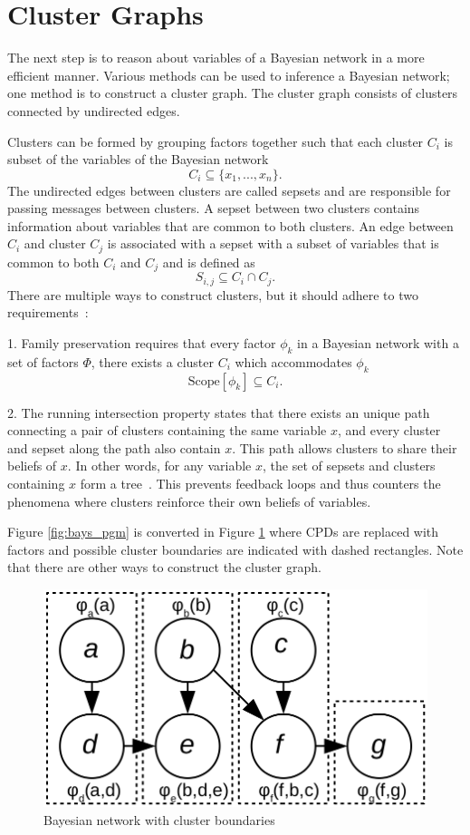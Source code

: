 \documentclass[12pt,oneside,openany,a4paper, %
afrikaans,english,
]{memoir}
\numberwithin{equation}{chapter}
\begin{document}
\section{Cluster Graphs}
The next step is to reason about variables of a Bayesian network in a more efficient manner. Various methods can be used to inference a Bayesian network; one method is to construct a cluster graph. The cluster graph consists of clusters connected by undirected edges.

Clusters can be formed by grouping factors together such that each cluster $C_i$ is subset of the variables of the Bayesian network
\begin{equation}
C_i \subseteq \{x_1, ..., x_n\}.
\end{equation}
The undirected edges between clusters are called sepsets and are responsible for passing messages between clusters. A sepset between two clusters contains information about variables that are common to both clusters. An edge between $C_i$ and cluster $C_j$ is associated with a sepset with a subset of variables that is common to both $C_i$ and $C_j$ and is defined as
\begin{equation}
S_{i,j} \subseteq C_i \cap C_j.
\end{equation}
There are multiple ways to construct clusters, but it should adhere to two requirements~\citep{koller}:

1. Family preservation requires that every factor $\phi_k$ in a Bayesian network with a set of factors $\Phi$, there exists a cluster $C_i$ which accommodates $\phi_k$
\begin{equation}
\text{Scope}[{\phi}_k] \subseteq C_i.
\end{equation}

2. The running intersection property states that there exists an unique path connecting a pair of clusters containing the same variable $x$, and every cluster and sepset along the path also contain $x$. This path allows clusters to share their beliefs of $x$. In other words, for any variable $x$, the set of sepsets and clusters containing $x$ form a tree~\citep{koller}. This prevents feedback loops and thus counters the phenomena where clusters reinforce their own beliefs of variables.

Figure \ref{fig:bays_pgm} is converted in Figure \ref{fig:cluster_bound} where CPDs are replaced with factors and possible cluster boundaries are indicated with dashed rectangles. Note that there are other ways to construct the cluster graph.
\begin{figure}[H]
  \includegraphics[width=0.6\linewidth]{Figures/cluster_divisions.png}
  \centering
  \caption{Bayesian network with cluster boundaries}
  \label{fig:cluster_bound}
\end{figure}
\end{document}

